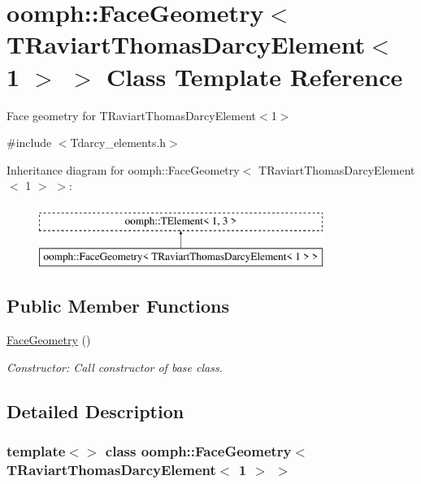 \hypertarget{classoomph_1_1FaceGeometry_3_01TRaviartThomasDarcyElement_3_011_01_4_01_4}{}\section{oomph\+:\+:Face\+Geometry$<$ T\+Raviart\+Thomas\+Darcy\+Element$<$ 1 $>$ $>$ Class Template Reference}
\label{classoomph_1_1FaceGeometry_3_01TRaviartThomasDarcyElement_3_011_01_4_01_4}


Face geometry for T\+Raviart\+Thomas\+Darcy\+Element$<$1$>$  




{\ttfamily \#include $<$Tdarcy\+\_\+elements.\+h$>$}

Inheritance diagram for oomph\+:\+:Face\+Geometry$<$ T\+Raviart\+Thomas\+Darcy\+Element$<$ 1 $>$ $>$\+:\begin{figure}[H]
\begin{center}
\leavevmode
\includegraphics[height=2.000000cm]{classoomph_1_1FaceGeometry_3_01TRaviartThomasDarcyElement_3_011_01_4_01_4}
\end{center}
\end{figure}
\subsection*{Public Member Functions}
\begin{DoxyCompactItemize}
\item 
\hyperlink{classoomph_1_1FaceGeometry_3_01TRaviartThomasDarcyElement_3_011_01_4_01_4_a538cb774351bae21422d8d9d9bdd06f0}{Face\+Geometry} ()
\begin{DoxyCompactList}\small\item\em Constructor\+: Call constructor of base class. \end{DoxyCompactList}\end{DoxyCompactItemize}


\subsection{Detailed Description}
\subsubsection*{template$<$$>$\newline
class oomph\+::\+Face\+Geometry$<$ T\+Raviart\+Thomas\+Darcy\+Element$<$ 1 $>$ $>$}

